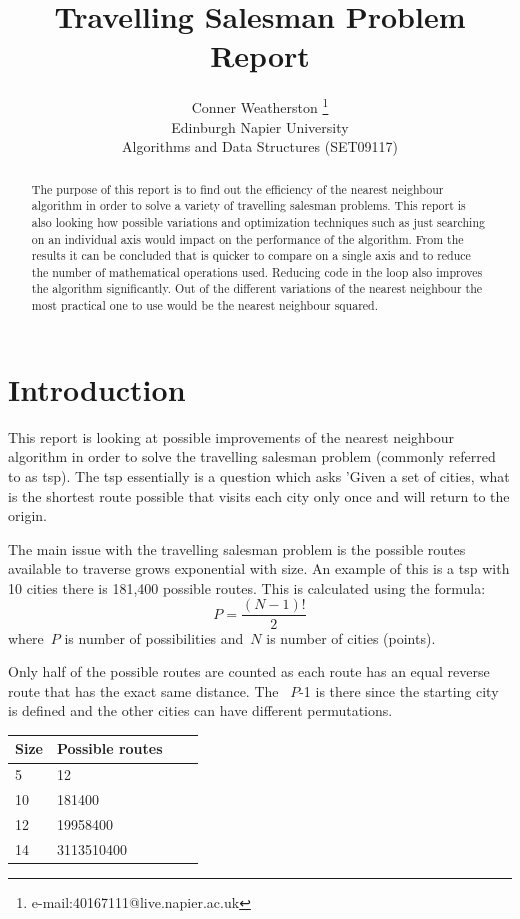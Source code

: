 \documentclass[conference,backref=page]{acmsiggraph}
\title{Travelling Salesman Problem\\
	   Report}
\author{Conner Weatherston \thanks{e-mail:40167111@live.napier.ac.uk} \\
Edinburgh Napier University\\
Algorithms and Data Structures (SET09117)}
\begin{document}
\maketitle

\raggedbottom

\begin{abstract}

The purpose of this report is to find out the efficiency of the nearest neighbour algorithm in order to solve a  variety of travelling salesman problems. This report is also looking how possible variations and optimization techniques such as just searching on an individual axis would impact on the performance of the algorithm. From the results it can be concluded that is quicker to compare on a single axis and to reduce the number of mathematical operations used. Reducing code in the loop also improves the algorithm significantly. Out of the different variations of the nearest neighbour the most practical one to use would be the nearest neighbour squared.
\end{abstract}



\keywordlist


\section{Introduction}

This report is looking at possible improvements of the nearest neighbour algorithm in order to solve the travelling salesman problem (commonly referred to as tsp). The tsp essentially is a question which asks 'Given a set of cities, what is the shortest route possible that visits each city only once and will return to the origin\cite{tsp}.

The main issue with the travelling salesman problem is the possible routes available to traverse grows exponential with size. An example of this is a tsp with 10 cities there is 181,400 possible routes. This is calculated using the formula:
 \begin{equation}
P =  \frac{(N-1)!}{2}
\end{equation}
where~$P$ is number of possibilities and~$N$ is number of cities (points).


Only half of the possible routes are counted as each route has an equal reverse route that has the exact same distance. The ~$P$-1 is there since the starting city is defined and the other cities can have different permutations.

\begin{center}
	\begin{tabular}{| l | l | l | l |}
		\hline
		Size& Possible routes\\ \hline
		5 & 12 \\ \hline
		10 & 181400 \\ \hline
		12 & 19958400 \\ \hline
		14 & 3113510400 \\ \hline
	\end{tabular}
\end{center}
\end{document}
